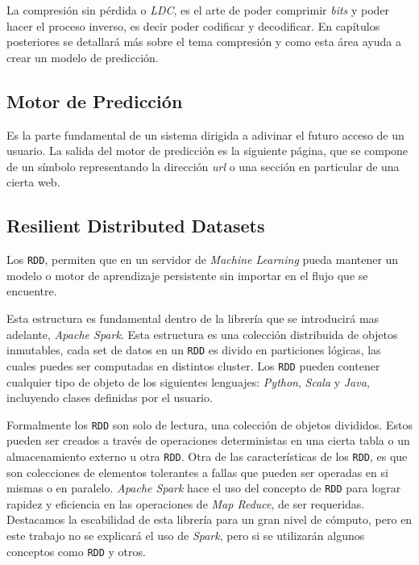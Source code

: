 La compresión sin pérdida o \emph{LDC}, es el arte de poder comprimir \emph{bits} y poder hacer el proceso inverso, es decir poder codificar y decodificar. En capítulos posteriores se detallará más sobre el tema compresión y como esta área ayuda a crear un modelo de predicción.





\subsection{Motor de Predicción}\label{concept-enginepredict}

Es la parte fundamental de un sistema dirigida a adivinar el futuro acceso de un usuario. La salida del motor de predicción es la siguiente página, que se compone de un símbolo representando la dirección \emph{url} o una sección en particular de una cierta web. 

 


\subsection{Resilient Distributed Datasets }\label{concept-RDD}

	Los \texttt{RDD}, permiten que en un servidor de \emph{Machine Learning } pueda mantener un modelo o motor de aprendizaje persistente sin importar en el flujo que se encuentre.

	Esta estructura es fundamental dentro de la librería que se introducirá mas adelante, \emph{Apache Spark}. Esta estructura es una colección distribuida de objetos inmutables, cada 
	set de datos en un \texttt{RDD} es divido en particiones lógicas, las cuales puedes ser computadas en distintos cluster. Los \texttt{RDD} pueden contener cualquier tipo de objeto de los siguientes lenguajes: \emph{Python}, \emph{Scala} y \emph{Java}, incluyendo clases definidas por el usuario. 

	Formalmente los \texttt{RDD} son solo de lectura, una colección de objetos divididos. Estos pueden ser creados a través de  operaciones deterministas en una cierta tabla o un almacenamiento externo u otra \texttt{RDD}.
	Otra de las características de los \texttt{RDD}, es que son colecciones de elementos tolerantes a fallas que pueden ser operadas en si mismas o en paralelo.
	\emph{Apache Spark} hace el uso del concepto de \texttt{RDD} para lograr rapidez y eficiencia en las operaciones de \emph{Map Reduce}, de ser requeridas. Destacamos la escabilidad de esta librería para un gran nivel de cómputo, pero en este trabajo no se explicará el uso de \emph{Spark}, pero si se utilizarán algunos conceptos como \texttt{RDD} y otros.




